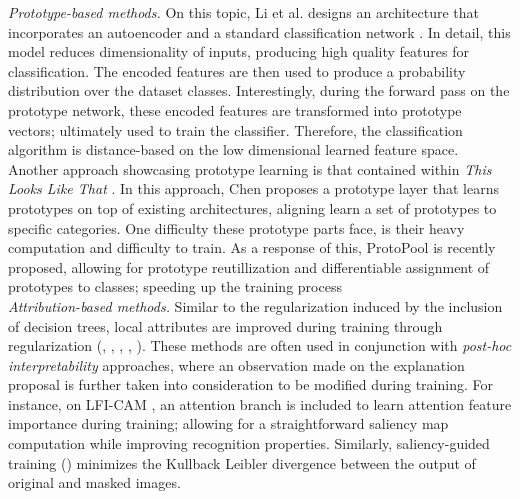 \noindent \emph{Prototype-based methods.} On this topic, Li et al. designs an architecture that 
incorporates an autoencoder and a standard classification network \autocite{li2018deep}. 
In detail, this model reduces dimensionality of inputs, producing high quality features for 
classification. The encoded features are then used to produce a probability distribution over the 
dataset classes. Interestingly, during the forward pass on the prototype network, these encoded 
features are transformed into prototype vectors; ultimately used to train the classifier. Therefore, 
the classification algorithm is distance-based on the low dimensional learned feature space. 
Another approach showcasing prototype learning is that contained within \emph{This Looks Like That} 
\autocite{chen2019looks}. In this approach, Chen proposes a prototype layer that learns prototypes 
on top of existing architectures, aligning learn a set of prototypes to specific categories.
One difficulty these prototype parts face, is their heavy computation and difficulty to 
train. As a response of this, ProtoPool \autocite{rymarczyk2022interpretable} is recently proposed, 
allowing for prototype reutillization and differentiable assignment of prototypes to classes; 
speeding up the training process\\

\noindent \emph{Attribution-based methods.} Similar to the regularization induced by the inclusion 
of decision trees, local attributes are improved during training through regularization 
(\cite{ismail2021improving}, \cite{Zhou_2022_BMVC}, \cite{ross2017right}, 
\cite{ghaeini2019saliency}, \cite{lee2021lfi}). These methods are often used in conjunction with 
\emph{post-hoc interpretability} approaches, where an observation made on the explanation proposal 
is further taken into consideration to be modified during training. For instance, on LFI-CAM 
\autocite{lee2021lfi},  an attention branch is included to learn attention feature importance 
during training; allowing for a straightforward saliency map computation while improving 
recognition properties. Similarly, saliency-guided training (\cite{ismail2021improving}) 
minimizes the Kullback Leibler divergence between the output of original and masked images. \\


